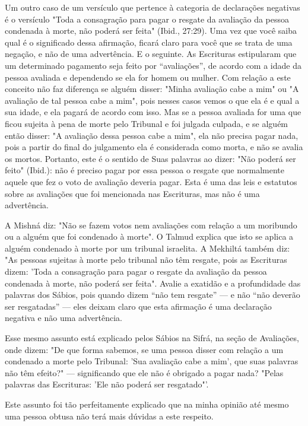 Um outro caso de um versículo que pertence à categoria de declara­ções
negativas é o versículo "Toda a consagração para pagar o resgate da
ava­liação da pessoa condenada à morte, não poderá ser feita" (Ibid.,
27:29). Uma vez que você saiba qual é o significado dessa afirmação,
ficará claro para você que se trata de uma negação, e não de uma
advertência. E o seguinte. As Escri­turas estipularam que um determinado
pagamento seja feito por ``avaliações'', de acordo com a idade da pessoa
avaliada e dependendo se ela for homem ou
mulher. Com relação a este conceito não faz
diferença se alguém disser: "Mi­nha avaliação cabe a mim" ou "A
avaliação de tal pessoa cabe a mim", pois nesses casos vemos o que ela é
e qual a sua idade, e ela pagará de acordo com isso. Mas se a pessoa
avaliada for uma que ficou sujeita à pena de morte pelo Tribunal e foi
julgada culpada, e se alguém então disser: "A avaliação dessa pes­soa
cabe a mim", ela não precisa pagar nada, pois a partir do final do
julgamen­to ela é considerada como morta, e não se avalia os mortos.
Portanto, este é o sentido de Suas palavras ao dizer: "Não poderá ser
feito" (Ibid.): não é preci­so pagar por essa pessoa o resgate que
normalmente aquele que fez o voto de avaliação deveria pagar. Esta é uma
das leis e estatutos sobre as avaliações que foi mencionada nas
Escrituras, mas não é uma advertência.

A Mishná diz: "Não se fazem votos nem avaliações com relação a um
moribundo ou a alguém que foi condenado à morte". O Talmud explica que
isto se aplica a alguém condenado à morte por um tribunal israelita. A
Mekhiltá também diz: "As pessoas sujeitas à morte pelo tribunal não têm
resgate, pois as Escrituras dizem: 'Toda a consagração para pagar o
resgate da avaliação da pessoa condenada à morte, não poderá ser feita".
Avalie a exatidão e a profun­didade das palavras dos Sábios, pois quando
dizem ``não tem resgate'' --- e não ``não deverão ser resgatadas'' --- eles
deixam claro que esta afirmação é uma declaração negativa e não uma
advertência.

Esse mesmo assunto está explicado pelos Sábios na Sifrá, na seção de
Avaliações, onde dizem: "De que forma sabemos, se uma pessoa disser com
relação a um condenado a morte pelo Tribunal: 'Sua avaliação cabe a
mim', que suas palavras não têm efeito?" --- significando que ele não é
obrigado a pagar nada? "Pelas palavras das Escrituras: 'Ele não poderá
ser resgatado"'.

Este assunto foi tão perfeitamente explicado que na minha opinião até
mesmo uma pessoa obtusa não terá mais dúvidas a este respeito.


